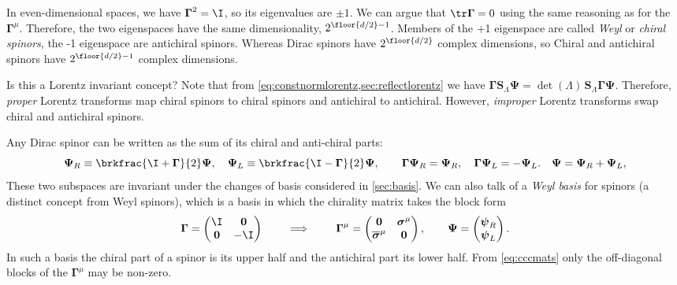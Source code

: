 \documentclass[11pt]{article}
\newcommand{\Gammab}{\boldsymbol{\Gamma}}
\renewcommand{\S}{\mathbf{S}}
\newcommand{\sigmab}{\boldsymbol{\sigma}}
\newcommand{\psib}{\boldsymbol{\psi}}
\newcommand{\Psib}{\boldsymbol{\Psi}}
\begin{document}
In even-dimensional spaces, we have $\Gammab^2 = \I$, so its eigenvalues are $\pm 1$.
We can argue that $\tr \Gammab = 0$ using the same reasoning as for the $\Gammab^\mu$.
Therefore, the two eigenspaces have the same dimensionality, $2^{\floor{d/2}-1}$.
Members of the +1 eigenspace are called \emph{Weyl} or \emph{chiral spinors}, the -1 eigenspace are antichiral spinors.
Whereas Dirac spinors have $2^{\floor{d/2}}$ complex dimensions, so Chiral and antichiral spinors have $2^{\floor{d/2}-1}$ complex dimensions.

Is this a Lorentz invariant concept?
Note that from \cref{eq:constnormlorentz,sec:reflectlorentz} we have \(\Gammab \S_\Lambda \Psib = \det (\Lambda)\, \S_\Lambda \Gammab \Psib\).
Therefore, \emph{proper} Lorentz transforms map chiral spinors to chiral spinors and antichiral to antichiral.
However, \emph{improper} Lorentz transforms swap chiral and antichiral spinors.

Any Dirac spinor can be written as the sum of its chiral and anti-chiral parts:
%
\begin{equation}\label{eq:Weylanti}
  \Psib_R \equiv \brkfrac{\I+\Gammab}{2} \Psib,
  \quad
  \Psib_L \equiv \brkfrac{\I-\Gammab}{2} \Psib,
  \qquad
  \Gammab \Psib_R = \Psib_R,
  \quad
  \Gammab \Psib_L = - \Psib_L.
  \quad
  \Psib = \Psib_R + \Psib_L,
\end{equation}
%
These two subspaces are invariant under the changes of basis considered in \cref{sec:basis}.
We can also talk of a \emph{Weyl basis} for spinors (a distinct concept from Weyl spinors), which is a basis in which the chirality matrix takes the block form
%
\begin{equation}\label{eq:weylbasis}
  \Gammab = \begin{pmatrix}
              \I         & \mathbf{0} \\
              \mathbf{0} & -\I        \\
            \end{pmatrix}
  \qquad
  \implies
  \qquad
  \Gammab^\mu = \begin{pmatrix}
                  \mathbf{0} & \sigmab^\mu \\
                  \overline{\sigmab}^\mu & \mathbf{0} \\
                \end{pmatrix}
  ,
  \qquad
  \Psib = \begin{pmatrix}
            \psib_R \\
            \psib_L \\
          \end{pmatrix}
  .
\end{equation}
%
In such a basis the chiral part of a spinor is its upper half and the antichiral part its lower half.
From \cref{eq:cccmats} only the off-diagonal blocks of the $\Gammab^\mu$ may be non-zero.
\end{document}
